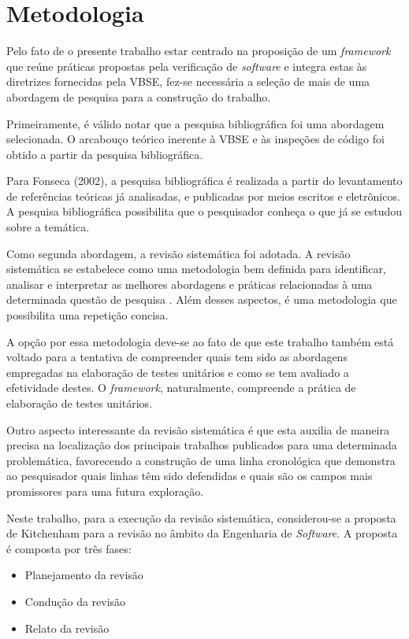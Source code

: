 \chapter{Metodologia}

Pelo fato de o presente trabalho estar centrado na proposição de um \textit{framework} que reúne práticas propostas pela verificação de \textit{software} e integra estas às diretrizes fornecidas pela VBSE, fez-se necessária a seleção de mais de uma abordagem de pesquisa para a construção do trabalho.

Primeiramente, é válido notar que a pesquisa bibliográfica foi uma abordagem selecionada. O arcabouço teórico inerente à VBSE e às inspeções de código foi obtido a partir da pesquisa bibliográfica.

Para Fonseca (2002), a pesquisa bibliográfica é realizada a partir do levantamento de referências teóricas já analisadas, e publicadas por meios escritos e eletrônicos. A pesquisa bibliográfica possibilita que o pesquisador conheça o que já se estudou sobre a temática.

Como segunda abordagem, a revisão sistemática foi adotada. A revisão sistemática se estabelece como uma metodologia bem definida para identificar, analisar e interpretar as melhores abordagens e práticas relacionadas à uma determinada questão de pesquisa \cite{sistematica}. Além desses aspectos, é uma metodologia que possibilita uma repetição concisa.

A opção por essa metodologia deve-se ao fato de que este trabalho também está voltado para a tentativa de compreender quais tem sido as abordagens empregadas na elaboração de testes unitários e como se tem avaliado a efetividade destes. O \textit{framework}, naturalmente, compreende a prática de elaboração de testes unitários.

Outro aspecto interessante da revisão sistemática é que esta auxilia de maneira precisa na localização dos principais trabalhos publicados para uma determinada problemática, favorecendo a construção de uma linha cronológica que demonstra ao pesquisador quais linhas têm sido defendidas e quais são os campos mais promissores para uma futura exploração.

Neste trabalho, para a execução da revisão sistemática, considerou-se a proposta de Kitchenham para a revisão no âmbito da Engenharia de \textit{Software}. A proposta é composta por três fases:

\begin{itemize}
	\item Planejamento da revisão
	\item Condução da revisão
	\item Relato da revisão
\end{itemize}

